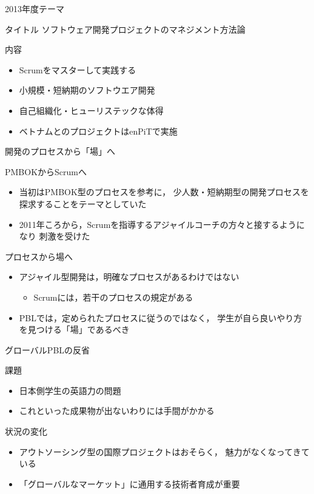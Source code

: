 \documentclass[t]{beamer}
\begin{document}
\begin{frame}[label=sec-4]{2013年度テーマ}
\begin{block}{タイトル}
ソフトウェア開発プロジェクトのマネジメント方法論
\end{block}

\begin{block}{内容}
\begin{itemize}
\item Scrumをマスターして実践する
\item 小規模・短納期のソフトウエア開発
\item 自己組織化・ヒューリステックな体得
\item ベトナムとのプロジェクトはenPiTで実施
\end{itemize}
\end{block}
\end{frame}
\begin{frame}[label=sec-5]{開発のプロセスから「場」へ}
\begin{block}{PMBOKからScrumへ}
\begin{itemize}
\item 当初はPMBOK型のプロセスを参考に，
少人数・短納期型の開発プロセスを探求することをテーマとしていた
\item 2011年ころから，Scrumを指導するアジャイルコーチの方々と接するようになり
刺激を受けた
\end{itemize}
\end{block}

\begin{block}{プロセスから場へ}
\begin{itemize}
\item アジャイル型開発は，明確なプロセスがあるわけではない
\begin{itemize}
\item Scrumには，若干のプロセスの規定がある
\end{itemize}
\item PBLでは，定められたプロセスに従うのではなく，
学生が自ら良いやり方を見つける「場」であるべき
\end{itemize}
\end{block}
\end{frame}
\begin{frame}[label=sec-6]{グローバルPBLの反省}
\begin{block}{課題}
\begin{itemize}
\item 日本側学生の英語力の問題
\item これといった成果物が出ないわりには手間がかかる
\end{itemize}
\end{block}

\begin{block}{状況の変化}
\begin{itemize}
\item アウトソーシング型の国際プロジェクトはおそらく，
魅力がなくなってきている
\item 「グローバルなマーケット」に通用する技術者育成が重要
\end{itemize}
\end{block}
\end{frame}
\end{document}
